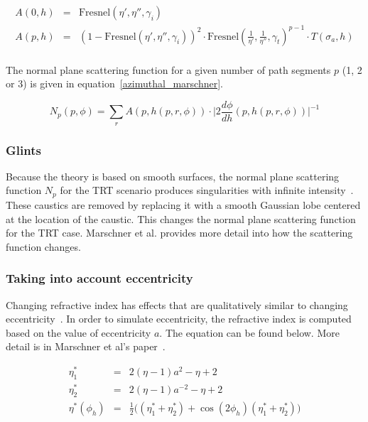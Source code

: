 \documentclass[11pt,a4paper]{report}
\begin{document}
\begin{eqnarray*}
A(0, h) & = & \textrm{Fresnel}( \eta', \eta'', \gamma_i ) \\
A(p, h) & = & (1 - \textrm{Fresnel}( \eta', \eta'', \gamma_i ))^2 \cdot \textrm{Fresnel}( \frac{1}{\eta'}, \frac{1}{\eta''}, \gamma_t )^ {p-1} \cdot T(\sigma_a, h) \\
\label{azimuthal_marschner}
\end{eqnarray*}

The normal plane scattering function for a given number of path segments $p$ (1, 2 or 3) is given in equation~\ref{azimuthal_marschner}.

\begin{equation}
N_p(p, \phi) = \sum\limits_r A(p, h(p, r, \phi)) \cdot \Big \vert 2 \frac{d\phi}{dh}( p, h(p, r, \phi) ) \Big \vert^{-1}
\end{equation}

\subsubsection{Glints}

Because the theory is based on smooth surfaces, the normal plane scattering function $N_p$ for the TRT scenario produces singularities with infinite intensity~\cite{marschner}. These caustics are removed by replacing it with a smooth Gaussian lobe centered at the location of the caustic. This changes the normal plane scattering function for the TRT case. Marschner et al.\cite{marschner} provides more detail into how the scattering function changes.

\subsubsection{Taking into account eccentricity}

Changing refractive index has effects that are qualitatively similar to changing eccentricity~\cite{marschner}. In order to simulate eccentricity, the refractive index is computed based on the value of eccentricity $a$. The equation can be found below. More detail is in Marschner et al's paper~\cite{marschner}.

\begin{eqnarray}
\eta_1^* & = & 2(\eta - 1) a^2 - \eta + 2 \\
\eta_2^* & = & 2(\eta - 1) a^{-2} - \eta + 2 \\
\eta^*(\phi_h) & = & \frac{1}{2}\big((\eta_1^* + \eta_2^*)+\cos(2\phi_h)(\eta_1^* + \eta_2^*) \big)
\end{eqnarray}
\end{document}
